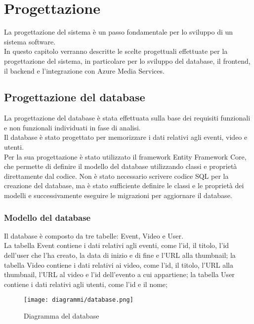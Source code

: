 \chapter{Progettazione}
\label{cap:progettazione}

La progettazione del sistema è un passo fondamentale per lo sviluppo di un sistema software.\\
In questo capitolo verranno descritte le scelte progettuali effettuate per la progettazione del sistema, in particolare per lo sviluppo del database, il frontend, il backend e l'integrazione con Azure Media Services.\\
\section{Progettazione del database}
La progettazione del database è stata effettuata sulla base dei requisiti funzionali e non funzionali individuati in fase di analisi.\\
Il database è stato progettato per memorizzare i dati relativi agli eventi, video e utenti.\\
Per la sua progettazione è stato utilizzato il framework Entity Framework Core, che permette di definire il modello del database utilizzando classi e proprietà direttamente dal codice. Non è stato necessario scrivere codice SQL per la creazione del database, ma è stato sufficiente definire le classi e le proprietà dei modelli e successivamente eseguire le migrazioni per aggiornare il database.\\

\clearpage

\subsection{Modello del database}
Il database è composto da tre tabelle: Event, Video e User.\\
La tabella Event contiene i dati relativi agli eventi, come l'id, il titolo, l'id dell'user che l'ha creato, la data di inizio e di fine e l'URL alla thumbnail; la tabella Video contiene i dati relativi ai video, come l'id, il titolo, l'URL alla thumbnail, l'URL al video e l'id dell'evento a cui appartiene; la tabella User contiene i dati relativi agli utenti, come l'id e il nome;

\begin{figure}[H] 
    \centering 
    \texttt{[image: diagrammi/database.png]} 
    \caption{Diagramma del database}
\end{figure}

